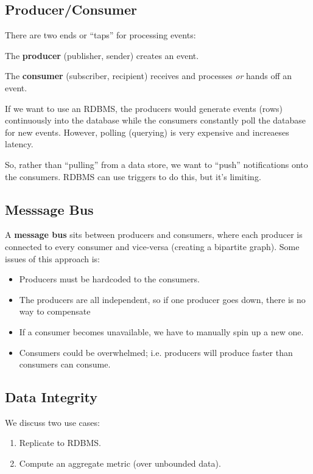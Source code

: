 \documentclass{report}
\newenvironment{definition}[1]{\begin{tcolorbox}[title={Definition: #1}]}{\end{tcolorbox}}
\renewcommand{\bf}[1]{\textbf{{#1}}}
\renewcommand{\it}[1]{\textit{{#1}}}
\begin{document}
\subsection{Producer/Consumer}
There are two ends or ``taps'' for processing events:
\begin{definition}{Producer and Consumer}
    The \bf{producer} (publisher, sender) creates an event.
    \vspace{0.5em}

    The \bf{consumer} (subscriber, recipient) receives and processes \it{or}
    hands off an event.
\end{definition}

If we want to use an RDBMS, the producers would generate events (rows)
continuously into the database while the consumers constantly poll the database
for new events. However, polling (querying) is very expensive and increaeses
latency.

So, rather than ``pulling'' from a data store, we want to ``push'' notifications
onto the consumers. RDBMS can use triggers to do this, but it's limiting.

\subsection{Messsage Bus}
A \bf{message bus} sits between producers and consumers, where each producer is
connected to every consumer and vice-versa (creating a bipartite graph). Some
issues of this approach is:
\begin{itemize}[label=$\to$]
    \item Producers must be hardcoded to the consumers.
    \item The producers are all independent, so if one producer goes down, there
        is no way to compensate
    \item If a consumer becomes unavailable, we have to manually spin up a new
        one.
    \item Consumers could be overwhelmed; i.e. producers will produce faster
        than consumers can consume.
\end{itemize}

\subsection{Data Integrity}
We discuss two use cases:
\begin{enumerate}[label=(\arabic*)]
    \item Replicate to RDBMS.
    \item Compute an aggregate metric (over unbounded data).
\end{enumerate}
\end{document}
